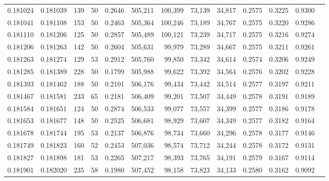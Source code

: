 \begin{tabular}{rrrrrrrrrrrrr}
0.181024 & 0.181039 &   139 &  50 &                                     0.2646 & 505,211 & 100,399 &  73,139 &  34,817 & 0.2575 & 0.3225 & 0.9300 \\
0.181041 & 0.181108 &   153 &  50 &                                     0.2463 & 505,364 & 100,246 &  73,189 &  34,767 & 0.2575 & 0.3220 & 0.9286 \\
0.181110 & 0.181206 &   125 &  50 &                                     0.2857 & 505,489 & 100,121 &  73,239 &  34,717 & 0.2575 & 0.3216 & 0.9274 \\
0.181206 & 0.181263 &   142 &  50 &                                     0.2604 & 505,631 &  99,979 &  73,289 &  34,667 & 0.2575 & 0.3211 & 0.9261 \\
0.181263 & 0.181274 &   129 &  53 &                                     0.2912 & 505,760 &  99,850 &  73,342 &  34,614 & 0.2574 & 0.3206 & 0.9249 \\
0.181285 & 0.181389 &   228 &  50 &                                     0.1799 & 505,988 &  99,622 &  73,392 &  34,564 & 0.2576 & 0.3202 & 0.9228 \\
0.181393 & 0.181462 &   188 &  50 &                                     0.2101 & 506,176 &  99,434 &  73,442 &  34,514 & 0.2577 & 0.3197 & 0.9211 \\
0.181467 & 0.181581 &   233 &  65 &                                     0.2181 & 506,409 &  99,201 &  73,507 &  34,449 & 0.2578 & 0.3191 & 0.9189 \\
0.181584 & 0.181651 &   124 &  50 &                                     0.2874 & 506,533 &  99,077 &  73,557 &  34,399 & 0.2577 & 0.3186 & 0.9178 \\
0.181653 & 0.181677 &   148 &  50 &                                     0.2525 & 506,681 &  98,929 &  73,607 &  34,349 & 0.2577 & 0.3182 & 0.9164 \\
0.181678 & 0.181744 &   195 &  53 &                                     0.2137 & 506,876 &  98,734 &  73,660 &  34,296 & 0.2578 & 0.3177 & 0.9146 \\
0.181749 & 0.181823 &   160 &  52 &                                     0.2453 & 507,036 &  98,574 &  73,712 &  34,244 & 0.2578 & 0.3172 & 0.9131 \\
0.181827 & 0.181898 &   181 &  53 &                                     0.2265 & 507,217 &  98,393 &  73,765 &  34,191 & 0.2579 & 0.3167 & 0.9114 \\
0.181901 & 0.182020 &   235 &  58 &                                     0.1980 & 507,452 &  98,158 &  73,823 &  34,133 & 0.2580 & 0.3162 & 0.9092 \\

\end{tabular}
